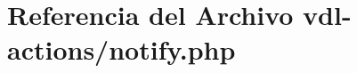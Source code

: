 \hypertarget{vdl-actions_2notify_8php}{\section{Referencia del Archivo vdl-\/actions/notify.php}
\label{vdl-actions_2notify_8php}
}
